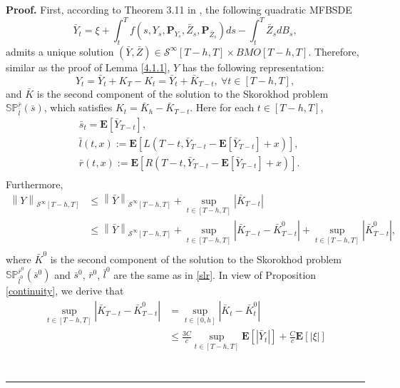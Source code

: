 \documentclass[10pt]{article}%
\numberwithin{equation}{section}
\newenvironment{proof}[1][Proof]{\noindent \textbf{#1.} }{\  \rule{0.5em}{0.5em}}
\def \E{\mathbf{E}}
\def \P{\mathbf{P}}
\begin{document}
\begin{proof}
 First, according to Theorem 3.11 in \cite{HHTW}, the following  quadratic MFBSDE 
\begin{equation}\label{yz}
 \bar{Y}_{t}=\xi+\int_t^{T} f(s,Y_s,\P_{Y_s},\bar{Z}_{s}, \P_{\bar{Z}_{s}})d s-\int_t^{T} \bar{Z}_{s} dB_s , 
 \end{equation}
 admits a unique solution $(\bar{Y},\bar{Z})\in\mathcal{S}^{\infty}[T-h,T]\times BMO[T-h,T]$. Therefore, similar as the proof of Lemma \ref{4.1.1}, $Y$ has the following representation:
$$Y_{t}=\bar{Y}_{t}+K_{T}-K_{t}=\bar{Y}_{t}+\bar{K}_{T-t},\ \forall t\in[T-h,T],$$
and $\bar{K}$ is the second component of the solution to the Skorokhod problem $\mathbb{SP}_{\bar{l}}^{\bar{r}}(\bar{s})$, which satisfies $K_t=\bar{K}_{h}-\bar{K}_{T-t}$. 
Here for each $t\in[T-h,T]$, 
\begin{equation}\label{salry}\begin{split}
&\bar{s}_t=\E\left[\bar{Y}_{T-t}\right],\\
&\bar{l}(t,x):=\E\left[L(T-t,\bar{Y}_{T-t}-\E\left[\bar{Y}_{T-t}\right]+x)\right],\\
&\bar{r}(t,x):=\E\left[R(T-t,\bar{Y}_{T-t}-\E\left[\bar{Y}_{T-t}\right]+x)\right].\\
\end{split}\end{equation}
Furthermore, 
\begin{equation}\begin{split}
\left\|Y\right\|_{\mathcal{S}^{\infty}[T-h,T]}&\leq\left\|\bar{Y}\right\|_{\mathcal{S}^{\infty}[T-h,T]}+\sup_{t\in[T-h,T]}\left|\bar{K}_{T-t}\right|\\
&\leq\left\|\bar{Y}\right\|_{\mathcal{S}^{\infty}[T-h,T]}+\sup_{t\in[T-h,T]}\left|\bar{K}_{T-t}-\bar{K}^0_{T-t}\right|+\sup_{t\in[T-h,T]}\left|\bar{K}^0_{T-t}\right|,\\
\end{split}   
\end{equation}
where $\bar{K}^0$ is the second component of the solution to the Skorokhod problem $\mathbb{SP}^{\bar{r}^0}_{\bar{l}^0}(\bar{s}^0)$ and $\bar{s}^0$, $\bar{r}^0$, $\bar{l}^0$ are the same as in  \eqref{slr}. In view of Proposition \ref{continuity}, we derive that 
$$
\begin{aligned}
\sup_{t \in[T-h, T]}\left|\bar{K}_{T-t}-\bar{K}^0_{T-t}\right|&=\sup_{t \in[0, h]}\left|\bar{K}_{t}-\bar{K}^0_{t}\right|\\
&\leq \frac{3C}{c}\sup_{t \in[T-h, T]}\mathbf{E}\left[\left|\bar{Y}_{t}\right|\right]+\frac{C}{c}\mathbf{E}\left[\left|\xi\right|\right]\\

\end{aligned}$$
\end{proof}
\end{document}
